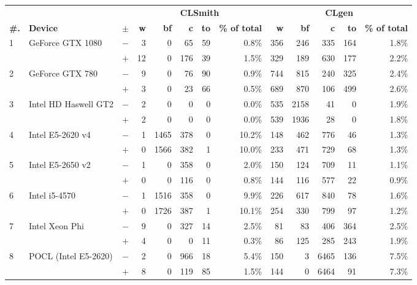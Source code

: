   \begin{tabular}{lll | rrrrr | rrrrr }
  \toprule
  & & & \multicolumn{5}{c|}{\textbf{CLSmith}} & \multicolumn{5}{c}{\textbf{CLgen}} \\
  \textbf{\#.} & \textbf{Device} & $\pm$ &
  \textbf{w} & \textbf{bf} & \textbf{c} & \textbf{to} & \textbf{\% of total} &
  \textbf{w} & \textbf{bf} & \textbf{c} & \textbf{to} & \textbf{\% of total} \\
  \midrule
  \multirow{ 2}{*}{1} & \multirow{ 2}{*}{GeForce GTX 1080} & $-$ & 3 & 0 & 65 & 59 & 0.8\%       & 356 & 246 & 335 & 164 & 1.8\% \\& & $+$ & 12 & 0 & 176 & 39 & 1.5\% & 329 & 189 & 630 & 177 & 2.2\% \\
\hline
\multirow{ 2}{*}{2} & \multirow{ 2}{*}{GeForce GTX 780} & $-$ & 9 & 0 & 76 & 90 & 0.9\%       & 744 & 815 & 240 & 325 & 2.4\% \\& & $+$ & 3 & 0 & 23 & 66 & 0.5\% & 689 & 870 & 106 & 499 & 2.6\% \\
\hline
\multirow{ 2}{*}{3} & \multirow{ 2}{*}{Intel HD Haswell GT2} & $-$ & 2 & 0 & 0 & 0 & 0.0\%       & 535 & 2158 & 41 & 0 & 1.9\% \\& & $+$ & 2 & 0 & 0 & 0 & 0.0\% & 539 & 1936 & 28 & 0 & 1.8\% \\
\hline
\multirow{ 2}{*}{4} & \multirow{ 2}{*}{Intel E5-2620 v4} & $-$ & 1 & 1465 & 378 & 0 & 10.2\%       & 148 & 462 & 776 & 46 & 1.3\% \\& & $+$ & 0 & 1566 & 382 & 1 & 10.0\% & 233 & 471 & 729 & 68 & 1.3\% \\
\hline
\multirow{ 2}{*}{5} & \multirow{ 2}{*}{Intel E5-2650 v2} & $-$ & 1 & 0 & 358 & 0 & 2.0\%       & 150 & 124 & 709 & 11 & 1.1\% \\& & $+$ & 0 & 0 & 116 & 0 & 0.8\% & 144 & 116 & 577 & 22 & 0.9\% \\
\hline
\multirow{ 2}{*}{6} & \multirow{ 2}{*}{Intel i5-4570} & $-$ & 1 & 1516 & 358 & 0 & 9.9\%       & 226 & 617 & 840 & 78 & 1.6\% \\& & $+$ & 0 & 1726 & 387 & 1 & 10.1\% & 254 & 330 & 799 & 97 & 1.2\% \\
\hline
\multirow{ 2}{*}{7} & \multirow{ 2}{*}{Intel Xeon Phi} & $-$ & 9 & 0 & 327 & 14 & 2.5\%       & 81 & 83 & 406 & 364 & 2.5\% \\& & $+$ & 4 & 0 & 0 & 11 & 0.3\% & 86 & 125 & 285 & 243 & 1.9\% \\
\hline
\multirow{ 2}{*}{8} & \multirow{ 2}{*}{POCL (Intel E5-2620)} & $-$ & 2 & 0 & 966 & 18 & 5.4\%       & 150 & 3 & 6465 & 136 & 7.5\% \\& & $+$ & 8 & 0 & 119 & 85 & 1.5\% & 144 & 0 & 6464 & 91 & 7.3\% \\

\end{tabular}
